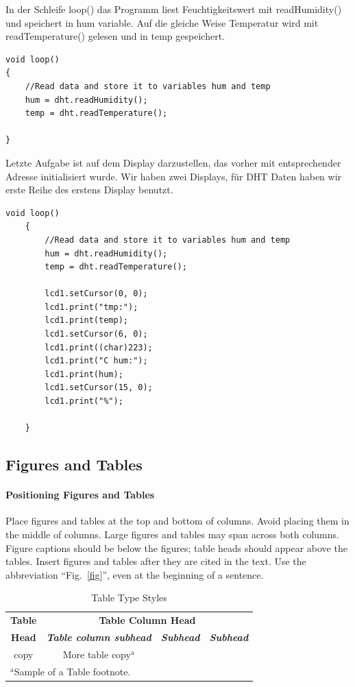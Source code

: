 \documentclass[conference]{IEEEtran}
\begin{document}
In der Schleife \textsf{loop()} das Programm liest Feuchtigkeitswert mit \textsf{readHumidity()} und speichert in \textsf{hum} variable. Auf die gleiche Weise Temperatur wird mit \textsf{readTemperature()} gelesen und in \textsf{temp} gespeichert. 

\begin{lstlisting}[style=CStyle]
void loop()
{
	//Read data and store it to variables hum and temp
	hum = dht.readHumidity();
	temp = dht.readTemperature();
	
}
\end{lstlisting}

Letzte Aufgabe ist auf dem Display darzustellen, das vorher  mit entsprechender Adresse initialisiert wurde. Wir haben zwei Displays, für DHT Daten haben wir erste Reihe des erstens Display benutzt. 

\begin{lstlisting}[style=CStyle]
	void loop()
	{
		//Read data and store it to variables hum and temp
		hum = dht.readHumidity();
		temp = dht.readTemperature();
		
		lcd1.setCursor(0, 0);
		lcd1.print("tmp:");
		lcd1.print(temp); 
		lcd1.setCursor(6, 0);
		lcd1.print((char)223);
		lcd1.print("C hum:");
		lcd1.print(hum);
		lcd1.setCursor(15, 0);
		lcd1.print("%");
		
	}
\end{lstlisting}


\subsection{Figures and Tables}
\paragraph{Positioning Figures and Tables} Place figures and tables at the top and 
bottom of columns. Avoid placing them in the middle of columns. Large 
figures and tables may span across both columns. Figure captions should be 
below the figures; table heads should appear above the tables. Insert 
figures and tables after they are cited in the text. Use the abbreviation 
``Fig.~\ref{fig}'', even at the beginning of a sentence.

\begin{table}[htbp]
\caption{Table Type Styles}
\begin{center}
\begin{tabular}{|c|c|c|c|}
\hline
\textbf{Table}&\multicolumn{3}{|c|}{\textbf{Table Column Head}} \\
\cline{2-4} 
\textbf{Head} & \textbf{\textit{Table column subhead}}& \textbf{\textit{Subhead}}& \textbf{\textit{Subhead}} \\
\hline
copy& More table copy$^{\mathrm{a}}$& &  \\
\hline
\multicolumn{4}{l}{$^{\mathrm{a}}$Sample of a Table footnote.}
\end{tabular}
\label{tab1}
\end{center}
\end{table}
\end{document}
